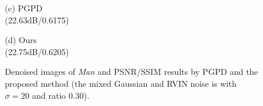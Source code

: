 \documentclass[runningheads]{llncs}
\begin{document}
\begin{figure}
{\begin{minipage}[t]{0.244\textwidth}
{\footnotesize (c) PGPD \\(22.63dB/0.6175)}
\end{minipage}
\begin{minipage}[t]{0.244\textwidth}
\centering
{}
{\footnotesize (d) Ours \\(22.75dB/0.6205)}
\end{minipage}
}
\caption{Denoised images of \textsl{Man} and PSNR/SSIM results by PGPD and the proposed method (the mixed Gaussian and RVIN noise is with $\sigma = 20$ and ratio $0.30$).}
\label{fig35}
\end{figure}
\end{document}
